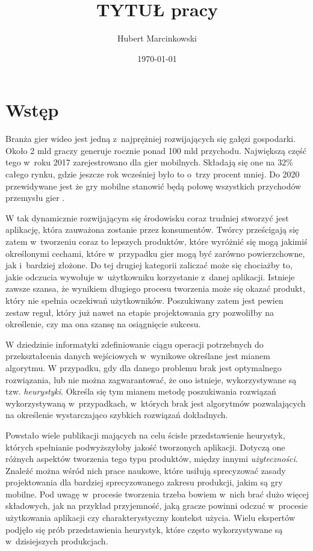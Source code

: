 \documentclass[a4paper,12pt,numbers=noenddot]{report}
\title{TYTUŁ pracy}
\date{\today}
\author{Hubert Marcinkowski}
\begin{document}
	\nocite{*}
	

	\newpage
	\tableofcontents
	\newpage
\chapter{Wstęp}

Branża gier wideo jest jedną z~najprężniej rozwijających się gałęzi gospodarki. Około 2 mld graczy generuje rocznie ponad 100 mld przychodu. Największą część tego w~roku 2017 zarejestrowano dla gier mobilnych. Składają się one na 32\% całego rynku, gdzie jeszcze rok wcześniej było to o~trzy procent mniej. Do 2020 przewidywane jest że gry mobilne stanowić będą połowę wszystkich przychodów przemysłu gier \cite{art_Market2017}. 

W tak dynamicznie rozwijającym się środowisku coraz trudniej stworzyć jest aplikację, która zauważona zostanie przez konsumentów. Twórcy prześcigają się zatem w~tworzeniu coraz to lepszych produktów, które wyróżnić się mogą jakimiś określonymi cechami, które w~przypadku gier mogą być zarówno powierzchowne, jak i~bardziej złożone. Do tej drugiej kategorii zaliczać może się chociażby to, jakie odczucia wywołuje w~użytkowniku korzystanie z~danej aplikacji. Istnieje zawsze szansa, że wynikiem długiego procesu tworzenia może się okazać produkt, który nie spełnia oczekiwań użytkowników. Poszukiwany zatem jest pewien zestaw reguł, który już nawet na etapie projektowania gry pozwoliłby na określenie, czy ma ona szansę na osiągnięcie sukcesu. 

W dziedzinie informatyki zdefiniowanie ciągu operacji potrzebnych do przekształcenia danych wejściowych w~wynikowe określane jest mianem algorytmu. W przypadku, gdy dla danego problemu brak jest optymalnego rozwiązania, lub nie można zagwarantować, że ono istnieje, wykorzystywane są tzw. \textit{heurystyki}. Określa się tym mianem metodę poszukiwania rozwiązań wykorzystywaną w~przypadkach, w~których brak jest algorytmów pozwalających na określenie wystarczająco szybkich rozwiązań dokładnych.

Powstało wiele publikacji mających na celu ścisłe przedstawienie heurystyk, których spełnianie podwyższyłoby jakość tworzonych aplikacji. Dotyczą one różnych aspektów tworzenia tego typu produktów, między innymi \textit{użyteczności}. Znaleźć można wśród nich prace naukowe, które usiłują sprecyzować zasady projektowania dla bardziej sprecyzowanego zakresu produkcji, jakim są gry mobilne. Pod uwagę w~procesie tworzenia trzeba bowiem w~nich brać dużo więcej składowych, jak na przykład przyjemność, jaką gracze powinni odczuć w~procesie użytkowania aplikacji czy charakterystyczny kontekst użycia. Wielu ekspertów podjęło się prób przedstawienia heurystyk, które często wykorzystywane są w~dzisiejszych produkcjach.
\end{document}
